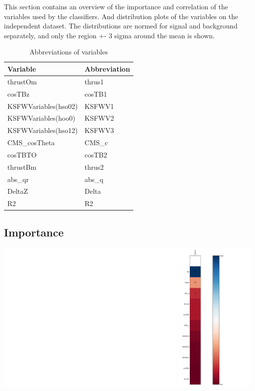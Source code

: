 \documentclass[10pt,a4paper]{article}
\begin{document}
            This section contains an overview of the importance and correlation of the variables used by the classifiers.
            And distribution plots of the variables on the independent dataset. The distributions are normed for signal and
            background separately, and only the region +- 3 sigma around the mean is shown.
        \begin{center}
\begin{longtable}{ll}
\caption{Abbreviations of variables}\\
\toprule
Variable & Abbreviation\\
\midrule
thrustOm & thrus1\\
cosTBz & cosTB1\\
KSFWVariables(hso02) & KSFWV1\\
KSFWVariables(hoo0) & KSFWV2\\
KSFWVariables(hso12) & KSFWV3\\
CMS\_cosTheta & CMS\_c\\
cosTBTO & cosTB2\\
thrustBm & thrus2\\
abs\_qr & abs\_q\\
DeltaZ & Delta\\
R2 & R2\\
\bottomrule
\end{longtable}
\end{center}
\subsection{Importance}
\begin{center}
\includegraphics[width=1.0\textwidth]{importance.pdf}
\end{center}
\end{document}

